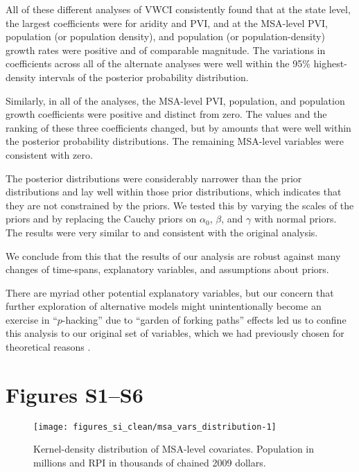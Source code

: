 \documentclass[draft]{agujournal}
\begin{document}
All of these different analyses of VWCI consistently found that
at the state level, the largest coefficients were for aridity and PVI,
and at the MSA-level PVI, population (or population density), and population
(or population-density) growth rates were positive and of comparable magnitude.
The variations in coefficients across all of the alternate analyses
were well within the 95\% highest-density
intervals of the posterior probability distribution.

Similarly, in all of the analyses, the MSA-level PVI, population, and population
growth coefficients were positive and distinct from zero. The values and the
ranking of these three coefficients changed, but by amounts that were well
within the posterior probability distributions. The remaining MSA-level
variables were consistent with zero.

The posterior distributions were considerably narrower than the prior
distributions and lay well within those prior distributions,
which indicates that they are not constrained by the priors.
We tested this by varying the scales of the priors and by
replacing the Cauchy priors on $\alpha_0$, $\beta$, and $\gamma$ with normal
priors.
The results were very similar to and consistent with the original analysis.

We conclude from this that the results of our analysis are robust against
many changes of time-spans, explanatory variables, and assumptions about priors.

There are myriad other potential explanatory variables, but our concern that
further exploration of alternative models might
unintentionally become an exercise in ``$p$-hacking'' due to
``garden of forking paths'' effects \citep{gelman:forking.paths:2014}
led us to confine this analysis to our original set of variables, which
we had previously chosen for theoretical reasons \citep{hess:drought:2016}.

\section*{Figures S1--S6}

\begin{figure}[H]
\texttt{[image: figures\_si\_clean/msa\_vars\_distribution-1]} \caption[Kernel-density distribution of MSA-level covariates]{Kernel-density distribution of MSA-level covariates. Population in millions and RPI in thousands of chained 2009 dollars.}\label{fig:msa_vars_distribution}
\end{figure}
\end{document}
